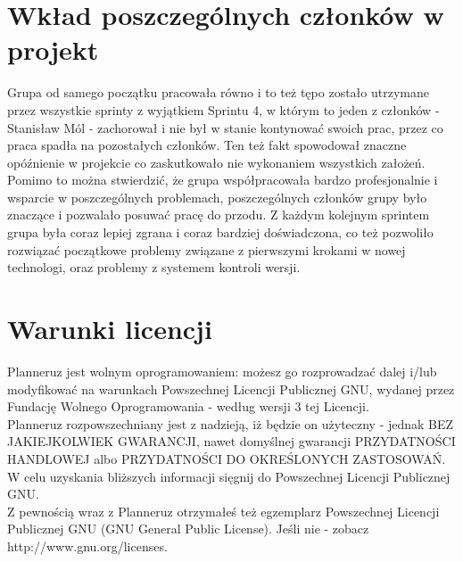 \documentclass[a4paper,11pt]{uzreport}
\begin{document}
\section{Wkład poszczególnych członków w projekt}

Grupa od samego początku pracowała równo i to też tępo zostało utrzymane przez wszystkie sprinty z wyjątkiem Sprintu 4, w którym to jeden z członków - Stanisław Mól - zachorował i nie był w stanie kontynować swoich prac, przez co praca spadła na pozostałych członków. Ten też fakt spowodował znaczne opóźnienie w projekcie co zaskutkowało nie wykonaniem wszystkich założeń. Pomimo to można stwierdzić, że grupa współpracowała bardzo profesjonalnie i wsparcie w poszczególnych problemach, poszczególnych członków grupy było znaczące i pozwalało posuwać pracę do przodu. Z każdym kolejnym sprintem grupa była coraz lepiej zgrana i coraz bardziej doświadczona, co też pozwoliło rozwiązać początkowe problemy związane z pierwszymi krokami w nowej technologi, oraz problemy z systemem kontroli wersji. 

\clearpage
\section{Warunki licencji}

    Planneruz jest wolnym oprogramowaniem: możesz go rozprowadzać dalej
    i/lub modyfikować na warunkach Powszechnej Licencji Publicznej GNU,
    wydanej przez Fundację Wolnego Oprogramowania - według wersji 3 tej
    Licencji.\\

    Planneruz rozpowszechniany jest z nadzieją, iż będzie on
    użyteczny - jednak BEZ JAKIEJKOLWIEK GWARANCJI, nawet domyślnej
    gwarancji PRZYDATNOŚCI HANDLOWEJ albo PRZYDATNOŚCI DO OKREŚLONYCH
    ZASTOSOWAŃ. W celu uzyskania bliższych informacji sięgnij do Powszechnej Licencji Publicznej GNU.\\

    Z pewnością wraz z Planneruz otrzymałeś też egzemplarz
    Powszechnej Licencji Publicznej GNU (GNU General Public License).
    Jeśli nie - zobacz http://www.gnu.org/licenses.\\
\end{document}
